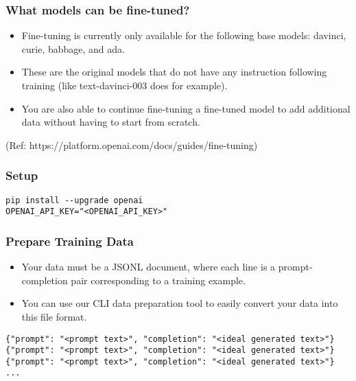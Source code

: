 \begin{frame}[fragile]\frametitle{What models can be fine-tuned?}

\begin{itemize}
\item Fine-tuning is currently only available for the following base models: davinci, curie, babbage, and ada. 
\item These are the original models that do not have any instruction following training (like text-davinci-003 does for example). 
\item You are also able to continue fine-tuning a fine-tuned model to add additional data without having to start from scratch.
\end{itemize}	 


{\tiny (Ref: https://platform.openai.com/docs/guides/fine-tuning)}
\end{frame}

\begin{frame}[fragile]\frametitle{Setup}

\begin{lstlisting}
pip install --upgrade openai
OPENAI_API_KEY="<OPENAI_API_KEY>"
\end{lstlisting}	 

\end{frame}

\begin{frame}[fragile]\frametitle{Prepare Training Data}

\begin{itemize}
\item Your data must be a JSONL document, where each line is a prompt-completion pair corresponding to a training example. 
\item You can use our CLI data preparation tool to easily convert your data into this file format.
\end{itemize}	 

\begin{lstlisting}
{"prompt": "<prompt text>", "completion": "<ideal generated text>"}
{"prompt": "<prompt text>", "completion": "<ideal generated text>"}
{"prompt": "<prompt text>", "completion": "<ideal generated text>"}
...
\end{lstlisting}	 

\end{frame}


